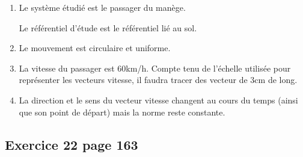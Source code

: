 \documentclass[12pt,a4paper,fleqn]{article}
\begin{document}
\begin{enumerate}
\item Le système étudié est le passager du manège.

Le référentiel d'étude est le référentiel lié au sol.

\item Le mouvement est circulaire et uniforme.

\item La vitesse du passager est \unit{60}{km/h}.
Compte tenu de l'échelle utilisée pour représenter les vecteurs vitesse, il faudra tracer des vecteur de \unit{3}{cm} de long.

\begin{center}
\end{center}

\item La direction et le sens du vecteur vitesse changent au cours du temps (ainsi que son point de départ) mais la norme reste constante.
\end{enumerate}

\subsection*{Exercice 22 page 163}
\end{document}
